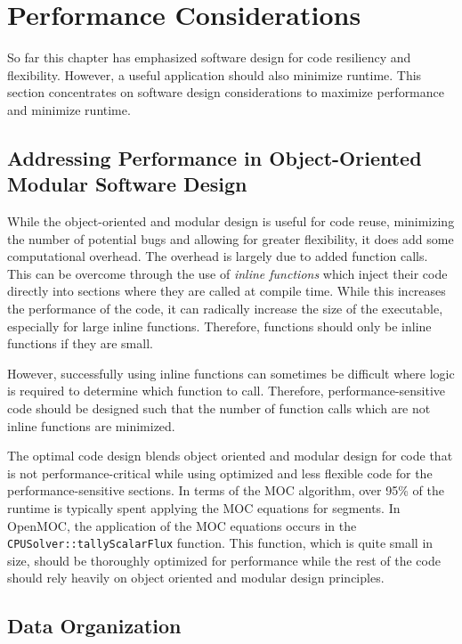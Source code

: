 \section{Performance Considerations}
\label{sec:software-performance-considerations}

So far this chapter has emphasized software design for code resiliency and flexibility. However, a useful application should also minimize runtime. This section concentrates on software design considerations to maximize performance and minimize runtime.

\subsection{Addressing Performance in Object-Oriented Modular Software Design}

While the object-oriented and modular design is useful for code reuse, minimizing the number of potential bugs and allowing for greater flexibility, it does add some computational overhead. The overhead is largely due to added function calls. This can be overcome through the use of \textit{inline functions} which inject their code directly into sections where they are called at compile time. While this increases the performance of the code, it can radically increase the size of the executable, especially for large inline functions. Therefore, functions should only be inline functions if they are small.

However, successfully using inline functions can sometimes be difficult where logic is required to determine which function to call. Therefore, performance-sensitive code should be designed such that the number of function calls which are not inline functions are minimized.

The optimal code design blends object oriented and modular design for code that is not performance-critical while using optimized and less flexible code for the performance-sensitive sections. In terms of the \ac{MOC} algorithm, over 95\% of the runtime is typically spent applying the \ac{MOC} equations for segments. In OpenMOC, the application of the \ac{MOC} equations occurs in the \texttt{CPUSolver::tallyScalarFlux} function. This function, which is quite small in size, should be thoroughly optimized for performance while the rest of the code should rely heavily on object oriented and modular design principles. 

\subsection{Data Organization}

